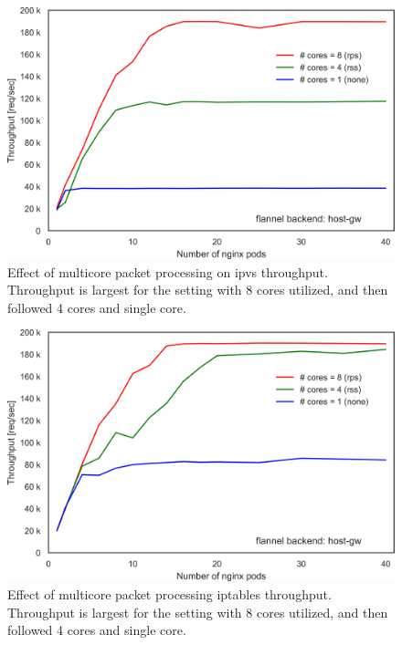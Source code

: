 \begin{figure}[h]
  \centering
  \includegraphics[width=0.9\columnwidth]{Figs/ipvs_mcore_proccessing}

  \centering
  \begin{minipage}{0.9\columnwidth}
    \caption[Effect of multicore packet processing on ipvs throughput]{
      Effect of multicore packet processing on ipvs throughput.
      Throughput is largest for the setting with 8 cores utilized, and then followed 4 cores and single core.
    }
    \label{fig:ipvs_mcore_proccessing}
  \end{minipage}
\end{figure}


\begin{figure}[h]
  \centering
  \includegraphics[width=0.9\columnwidth]{Figs/iptables_mcore_proccessing}

  \centering
  \begin{minipage}{0.9\columnwidth}
    \caption[Effect of multicore packet processing on iptables DNAT throughput]{
      Effect of multicore packet processing iptables throughput.
      Throughput is largest for the setting with 8 cores utilized, and then followed 4 cores and single core.
    }
    \label{fig:iptables_mcore_proccessing}
  \end{minipage}
\end{figure}


